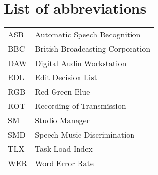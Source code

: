 \chapter*{List of abbreviations}

\begin{tabular}{l l}
ASR & Automatic Speech Recognition \\
BBC & British Broadcasting Corporation \\
DAW & Digital Audio Workstation \\
EDL & Edit Decision List \\
RGB & Red Green Blue \\
ROT & Recording of Transmission \\
SM  & Studio Manager \\
SMD & Speech Music Discrimination \\
TLX & Task Load Index \\
WER & Word Error Rate
\end{tabular}
